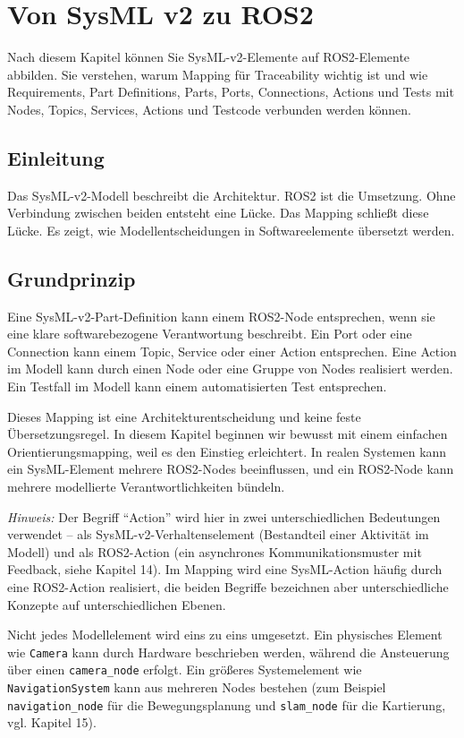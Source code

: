 \chapter{Von SysML v2 zu ROS2}

\begin{lernziele}
Nach diesem Kapitel können Sie SysML-v2-Elemente auf ROS2-Elemente abbilden. Sie verstehen, warum Mapping für Traceability wichtig ist und wie Requirements, Part Definitions, Parts, Ports, Connections, Actions und Tests mit Nodes, Topics, Services, Actions und Testcode verbunden werden können.
\end{lernziele}

\section{Einleitung}
Das SysML-v2-Modell beschreibt die Architektur. ROS2 ist die Umsetzung. Ohne Verbindung zwischen beiden entsteht eine Lücke. Das Mapping schließt diese Lücke. Es zeigt, wie Modellentscheidungen in Softwareelemente übersetzt werden.

\section{Grundprinzip}
Eine SysML-v2-Part-Definition kann einem ROS2-Node entsprechen, wenn sie eine klare softwarebezogene Verantwortung beschreibt. Ein Port oder eine Connection kann einem Topic, Service oder einer Action entsprechen. Eine Action im Modell kann durch einen Node oder eine Gruppe von Nodes realisiert werden. Ein Testfall im Modell kann einem automatisierten Test entsprechen.

Dieses Mapping ist eine Architekturentscheidung und keine feste Übersetzungsregel. In diesem Kapitel beginnen wir bewusst mit einem einfachen Orientierungsmapping, weil es den Einstieg erleichtert. In realen Systemen kann ein SysML-Element mehrere ROS2-Nodes beeinflussen, und ein ROS2-Node kann mehrere modellierte Verantwortlichkeiten bündeln.

\emph{Hinweis:} Der Begriff \enquote{Action} wird hier in zwei unterschiedlichen Bedeutungen verwendet – als SysML-v2-Verhaltenselement (Bestandteil einer Aktivität im Modell) und als ROS2-Action (ein asynchrones Kommunikationsmuster mit Feedback, siehe Kapitel 14). Im Mapping wird eine SysML-Action häufig durch eine ROS2-Action realisiert, die beiden Begriffe bezeichnen aber unterschiedliche Konzepte auf unterschiedlichen Ebenen.

Nicht jedes Modellelement wird eins zu eins umgesetzt. Ein physisches Element wie \texttt{Camera} kann durch Hardware beschrieben werden, während die Ansteuerung über einen \texttt{camera\_node} erfolgt. Ein größeres Systemelement wie \texttt{NavigationSystem} kann aus mehreren Nodes bestehen (zum Beispiel \texttt{navigation\_node} für die Bewegungsplanung und \texttt{slam\_node} für die Kartierung, vgl. Kapitel 15).

